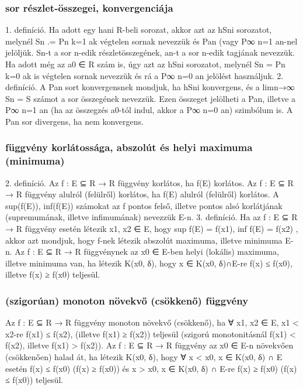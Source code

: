 \documentclass[12pt]{article}
\begin{document}
\subsubsection{sor részlet-összegei, konvergenciája}

1. definíció. Ha adott egy hani R-beli sorozat, akkor azt az hSni sorozatot,
melynél Sn
.=
Pn
k=1
ak végtelen sornak nevezzük és Pan (vagy P∞
n=1
an-nel
jelöljük. Sn-t a sor n-edik részletösszegének, an-t a sor n-edik tagjának
nevezzük. Ha adott még az a0 ∈ R szám is, úgy azt az hSni sorozatot,
melynél Sn =
Pn
k=0
ak is végtelen sornak nevezzük és rá a
P∞
n=0
an jelölést
használjuk.
2. definíció. A
Pan sort konvergensnek mondjuk, ha hSni konvergens,
és a limn→∞
Sn = S számot a sor összegének nevezzük.
Ezen összeget jelölheti a
Pan, illetve a
P∞
n=1
an (ha az összegzés a0-tól indul,
akkor a
P∞
n=0
an) szimbólum is.
A
Pan sor divergens, ha nem konvergens.

\subsubsection{függvény korlátossága, abszolút és helyi maximuma (minimuma)}

2. definíció. Az f : E ⊆ R → R függvény korlátos, ha f(E) korlátos.
Az f : E ⊆ R → R függvény alulról (felülről) korlátos, ha f(E) alulról
(felülről) korlátos.
A sup(f(E)), inf(f(E)) számokat az f pontos felső, illetve pontos alsó korlátjának
(supremumának, illetve infimumának) nevezzük E-n.
3. definíció. Ha az f : E ⊆ R → R függvény esetén létezik x1, x2 ∈ E,
hogy
sup f(E) = f(x1), inf f(E) = f(x2) ,
akkor azt mondjuk, hogy f-nek létezik abszolút maximuma, illetve minimuma
E-n.
Az f : E ⊆ R → R függvénynek az x0 ∈ E-ben helyi (lokális) maximuma,
illetve minimuma van, ha létezik K(x0, δ), hogy x ∈ K(x0, δ)∩E-re
f(x) ≤ f(x0), illetve f(x) ≥ f(x0) teljesül.

\subsubsection{(szigorúan) monoton növekvő (csökkenő) függvény}

Az f : E ⊆ R → R függvény monoton növekvő (csökkenő),
ha ∀ x1, x2 ∈ E, x1 < x2-re f(x1) ≤ f(x2), (illetve f(x1) ≥ f(x2))
teljesül (szigorú monotonitásnál f(x1) < f(x2), illetve f(x1) > f(x2)).
Az f : E ⊆ R → R függvény az x0 ∈ E-n növekvően (csökkenően) halad át,
ha létezik K(x0, δ), hogy ∀ x < x0, x ∈ K(x0, δ) ∩ E esetén
f(x) ≤ f(x0) (f(x) ≥ f(x0))
és x > x0, x ∈ K(x0, δ) ∩ E-re
f(x) ≥ f(x0) (f(x) ≤ f(x0))
teljesül.
\end{document}
